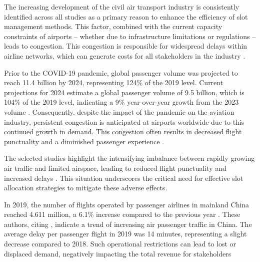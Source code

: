 The increasing development of the civil air transport industry is consistently identified across all studies as a primary reason to enhance the efficiency of slot management methods. This factor, combined with the current capacity constraints of airports – whether due to infrastructure limitations or regulations – leads to congestion. This congestion is responsible for widespread delays within airline networks, which can generate costs for all stakeholders in the industry \cite{ribeiro2018optimization, dixit_algorithmic_2023}.

Prior to the COVID-19 pandemic, global passenger volume was projected to reach 11.4 billion by 2024, representing 124\% of the 2019 level. Current projections for 2024 estimate a global passenger volume of 9.5 billion, which is 104\% of the 2019 level, indicating a 9\% year-over-year growth from the 2023 volume \cite{ACI_AirTravelDemand2025}. Consequently, despite the impact of the pandemic on the aviation industry, persistent congestion is anticipated at airports worldwide due to this continued growth in demand. This congestion often results in decreased flight punctuality and a diminished passenger experience \cite{liu_research_2022}.

%

The selected studies highlight the intensifying imbalance between rapidly growing air traffic and limited airspace, leading to reduced flight punctuality and increased delays \cite{corolli_time_2014, gillen2016airport, pellegrini_sosta_2017, jacquillat_interairline_2018, ribeiro2018optimization, jacquillat_roadmap_2018, zografos_bi-objective_2019, lambelho_assessing_2020, zeng_data-driven_2021, kuran_heuristic_nodate, keskin_optimal_2023, wang_slot_2023}. This situation underscores the critical need for effective slot allocation strategies to mitigate these adverse effects.

In 2019, the number of flights operated by passenger airlines in mainland China reached 4.611 million, a 6.1\% increase compared to the previous year \cite{wang_distribution_2022}. These authors, citing , indicate a trend of increasing air passenger traffic in China. The average delay per passenger flight in 2019 was 14 minutes, representing a slight decrease compared to 2018. Such operational restrictions can lead to lost or displaced demand, negatively impacting the total revenue for stakeholders \cite{jacquillat_roadmap_2018}

